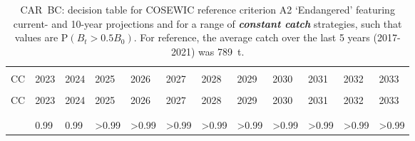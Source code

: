 \documentclass[11pt]{book}
\newcommand{\itbf}[1]{\textit{\textbf{#1}}}
\begin{document}
\begin{longtable}[c]{>{\raggedright\let\newline\\\arraybackslash\hspace{0pt}}p{0.5in}>{\raggedleft\let\newline\\\arraybackslash\hspace{0pt}}p{0.5in}>{\raggedleft\let\newline\\\arraybackslash\hspace{0pt}}p{0.5in}>{\raggedleft\let\newline\\\arraybackslash\hspace{0pt}}p{0.53in}>{\raggedleft\let\newline\\\arraybackslash\hspace{0pt}}p{0.53in}>{\raggedleft\let\newline\\\arraybackslash\hspace{0pt}}p{0.53in}>{\raggedleft\let\newline\\\arraybackslash\hspace{0pt}}p{0.53in}>{\raggedleft\let\newline\\\arraybackslash\hspace{0pt}}p{0.53in}>{\raggedleft\let\newline\\\arraybackslash\hspace{0pt}}p{0.53in}>{\raggedleft\let\newline\\\arraybackslash\hspace{0pt}}p{0.53in}>{\raggedleft\let\newline\\\arraybackslash\hspace{0pt}}p{0.53in}>{\raggedleft\let\newline\\\arraybackslash\hspace{0pt}}p{0.53in}}
  \caption{CAR~BC: decision table for COSEWIC reference criterion A2 `Endangered' featuring current- and 10-year projections and for a range of \itbf{constant catch} strategies, such that values are P$(B_t > 0.5 B_0)$. For reference, the average catch over the last 5 years (2017-2021) was 789~t. } \label{tab:car.cosewic.50B0.CCs}\\  \hline\\[-2.2ex]  CC  & 2023 & 2024 & 2025 & 2026 & 2027 & 2028 & 2029 & 2030 & 2031 & 2032 & 2033 \\[0.2ex]\hline\\[-1.5ex]  \endfirsthead   \hline  CC  & 2023 & 2024 & 2025 & 2026 & 2027 & 2028 & 2029 & 2030 & 2031 & 2032 & 2033 \\[0.2ex]\hline\\[-1.5ex]  \endhead  \hline\\[-2.2ex]   \endfoot  \hline \endlastfoot  0 & 0.99 & 0.99 & >0.99 & >0.99 & >0.99 & >0.99 & >0.99 & >0.99 & >0.99 & >0.99 & >0.99 \\ 

\end{longtable}
\end{document}
